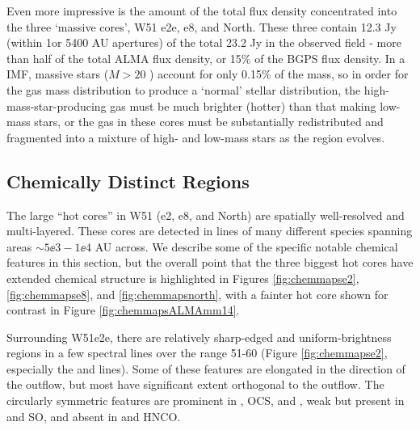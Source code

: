 \documentclass{emulateapj}
\begin{document}
Even more impressive is the amount of the total flux density concentrated
into the three `massive cores', W51 e2e, e8, and North.  These three contain
12.3 Jy (within 1\arcsec or 5400 AU apertures) of the total 23.2 Jy in the
observed field - more than half of the total ALMA flux density, or 15\% of the
BGPS flux density.  In a \citet{Kroupa2001a} IMF, massive stars ($M>20$ \msun)
account for only 0.15\% of the mass, so in order for the gas mass distribution
to produce a `normal' stellar distribution, the high-mass-star-producing gas
must be much brighter (hotter) than that making low-mass stars, or the gas 
in these cores must be substantially redistributed and fragmented into a
mixture of high- and low-mass stars as the region evolves.


\subsection{Chemically Distinct Regions}
\label{sec:chemistrymaps}
\label{sec:chemistrymapsobs}
The large ``hot cores'' in W51 (e2, e8, and North) are spatially well-resolved
and multi-layered.  These cores are detected in lines of many different species
spanning areas $\sim5\ee{3}-1\ee{4}$ AU across.  We describe some of the
specific notable chemical features in this section, but the overall point that
the three biggest hot cores have extended chemical structure is highlighted in
Figures \ref{fig:chemmapse2}, \ref{fig:chemmapse8}, and
\ref{fig:chemmapsnorth}, with a fainter hot core shown for contrast in Figure
\ref{fig:chemmapsALMAmm14}.

Surrounding W51e2e, there are relatively sharp-edged and uniform-brightness
regions in a few spectral lines over the range 51-60 \kms (Figure
\ref{fig:chemmapse2}, especially the \methanol and \methylformate lines).  Some
of these features are elongated in the direction
of the outflow, but most have significant extent orthogonal to the outflow.
The circularly symmetric features are prominent in \methanol, OCS, and
\dimethylether, weak but present in \formaldehyde and SO, and absent in
\cyanoacetylene and HNCO.
\end{document}
